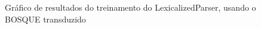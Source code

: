 \begin{figure}[!ht]
    \centering
    
    \caption[Gráfico de resultados do treinamento, usando o BOSQUE transduzido]{Gráfico de resultados do treinamento do LexicalizedParser, usando o BOSQUE transduzido}
    \label{fig:treino_bosque}
\end{figure}